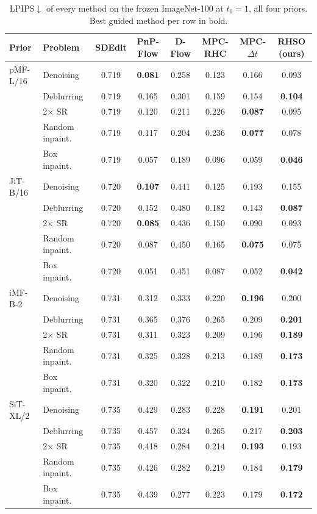 \begin{table}[t]
\centering
\small
\setlength{\tabcolsep}{4pt}
\caption{LPIPS$\downarrow$ of every method on the frozen ImageNet-100 at $t_0 = 1$, all four priors. Best guided method per row in bold.}
\label{tab:final_lpips_summary}
\begin{tabular}{llcccccc}
\toprule
Prior & Problem & SDEdit & PnP-Flow & D-Flow & MPC-RHC & MPC-$\Delta t$ & RHSO (ours) \\
\midrule
pMF-L/16 & Denoising & 0.719 & \textbf{0.081} & 0.258 & 0.123 & 0.166 & 0.093 \\
 & Deblurring & 0.719 & 0.165 & 0.301 & 0.159 & 0.154 & \textbf{0.104} \\
 & 2$\times$ SR & 0.719 & 0.120 & 0.211 & 0.226 & \textbf{0.087} & 0.095 \\
 & Random inpaint. & 0.719 & 0.117 & 0.204 & 0.236 & \textbf{0.077} & 0.078 \\
 & Box inpaint. & 0.719 & 0.057 & 0.189 & 0.096 & 0.059 & \textbf{0.046} \\
\midrule
JiT-B/16 & Denoising & 0.720 & \textbf{0.107} & 0.441 & 0.125 & 0.193 & 0.155 \\
 & Deblurring & 0.720 & 0.152 & 0.480 & 0.182 & 0.143 & \textbf{0.087} \\
 & 2$\times$ SR & 0.720 & \textbf{0.085} & 0.436 & 0.150 & 0.090 & 0.093 \\
 & Random inpaint. & 0.720 & 0.087 & 0.450 & 0.165 & \textbf{0.075} & 0.075 \\
 & Box inpaint. & 0.720 & 0.051 & 0.451 & 0.087 & 0.052 & \textbf{0.042} \\
\midrule
iMF-B-2 & Denoising & 0.731 & 0.312 & 0.333 & 0.220 & \textbf{0.196} & 0.200 \\
 & Deblurring & 0.731 & 0.365 & 0.376 & 0.265 & 0.209 & \textbf{0.201} \\
 & 2$\times$ SR & 0.731 & 0.311 & 0.323 & 0.209 & 0.196 & \textbf{0.189} \\
 & Random inpaint. & 0.731 & 0.325 & 0.328 & 0.213 & 0.189 & \textbf{0.173} \\
 & Box inpaint. & 0.731 & 0.320 & 0.322 & 0.210 & 0.182 & \textbf{0.173} \\
\midrule
SiT-XL/2 & Denoising & 0.735 & 0.429 & 0.283 & 0.228 & \textbf{0.191} & 0.201 \\
 & Deblurring & 0.735 & 0.457 & 0.324 & 0.265 & 0.217 & \textbf{0.203} \\
 & 2$\times$ SR & 0.735 & 0.418 & 0.284 & 0.214 & \textbf{0.193} & 0.193 \\
 & Random inpaint. & 0.735 & 0.426 & 0.282 & 0.219 & 0.184 & \textbf{0.179} \\
 & Box inpaint. & 0.735 & 0.439 & 0.277 & 0.223 & 0.179 & \textbf{0.172} \\
\bottomrule
\end{tabular}
\end{table}

